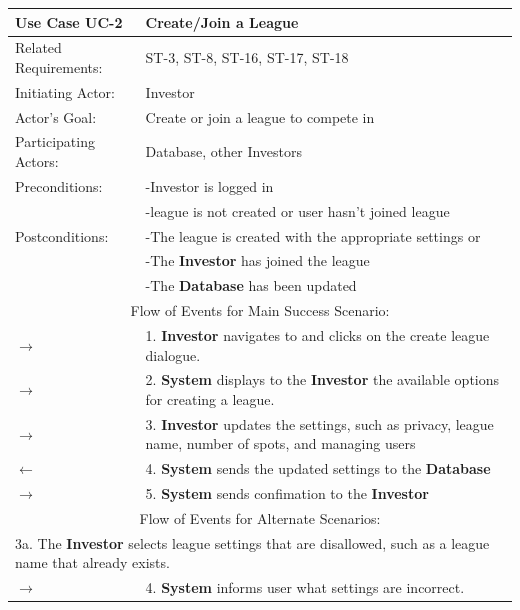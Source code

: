 \begin{centering}
\renewcommand\arraystretch{1.3}
\label{UC-2}
\begin{longtable}{|p{1.2in} p{5in}|}
\hline
\bfseries{\color{color1}Use Case UC-2} &
\bfseries{\color{color1}Create/Join a League} \\
\hline
Related Requirements: & ST-3, ST-8, ST-16, ST-17, ST-18\\
Initiating Actor:     & Investor \\
Actor's Goal:         & Create or join a league to compete in\\
Participating Actors: & Database, other Investors \\
Preconditions:        & -Investor is logged in \\
                      & -league is not created or user hasn't joined league \\
Postconditions:       & -The league is created with the appropriate settings or \\
                      & -The \textbf{Investor} has joined the league \\
                      & -The \textbf{Database} has been updated \\
\hline
\multicolumn{2}{|c|}{\color{color1}Flow of Events for Main Success Scenario:}\\
\hline

$\rightarrow$ & 1. \textbf{Investor} navigates to and clicks on the create league dialogue. \\
$\rightarrow$ & 2. \textbf{System} displays to the \textbf{Investor} the available options for
creating a league.  \\
$\rightarrow$ & 3. \textbf{Investor} updates the settings, such as privacy, league name, number of spots, and managing users \\
$\leftarrow$ & 4. \textbf{System} sends the updated settings to the \textbf{Database} \\
$\rightarrow$ & 5. \textbf{System} sends confimation to the \textbf{Investor} \\
\hline

\multicolumn{2}{|c|}{\color{color1}Flow of Events for Alternate Scenarios:} \\
\hline

\multicolumn{2}{|p{6.2in}|}{3a. The \textbf{Investor} selects league settings that are disallowed,
such as a league name that already exists.} \\ \hline

$\rightarrow$ & 4. \textbf{System} informs user what settings are incorrect.\\ \hline


\end{longtable}
\end{centering}
